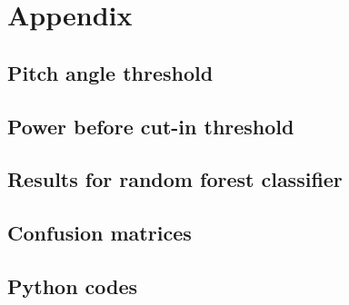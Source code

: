 
\chapter{Appendix}

\section{Pitch angle threshold}\label{a1}

\section{Power before cut-in threshold}\label{a2}

\section{Results for random forest classifier}\label{a3}

\section{Confusion matrices}\label{a4}

\section{Python codes}\label{a5}
